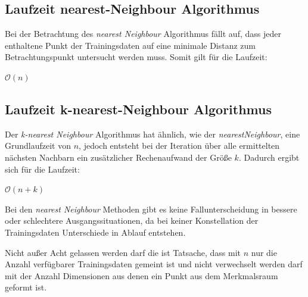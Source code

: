 \documentclass[fontsize=11pt]{scrartcl}
\begin{document}
            \subsection{Laufzeit nearest-Neighbour Algorithmus}
                Bei der Betrachtung des \emph{nearest Neighbour} Algorithmus fällt auf, dass jeder enthaltene Punkt der Trainingsdaten auf eine minimale Distanz zum Betrachtungspunkt untersucht werden muss. Somit gilt für die Laufzeit:\par
              \centering  $\mathcal{O}(n)$\par   
            
            \subsection{Laufzeit k-nearest-Neighbour Algorithmus}
                Der \emph{k-nearest Neighbour} Algorithmus hat ähnlich, wie der \emph{nearestNeighbour}, eine Grundlaufzeit von $n$, jedoch entsteht bei der Iteration über alle ermittelten nächsten Nachbarn ein zusätzlicher Rechenaufwand der Größe $k$. Dadurch ergibt sich für die Laufzeit:\par
                \centering $\mathcal{O}(n+k)$\par
                Bei den \emph{nearest Neighbour} Methoden gibt es keine Fallunterscheidung in bessere oder schlechtere Ausgangssituationen, da bei keiner Konstellation der Trainingsdaten Unterschiede in Ablauf entstehen. \par
                Nicht außer Acht gelassen werden darf die ist Tatsache, dass mit $n$ nur die Anzahl verfügbarer Trainingsdaten gemeint ist und nicht verwechselt werden darf mit der Anzahl Dimensionen aus denen ein Punkt aus dem Merkmalsraum geformt ist. 


    
    
\end{document}
